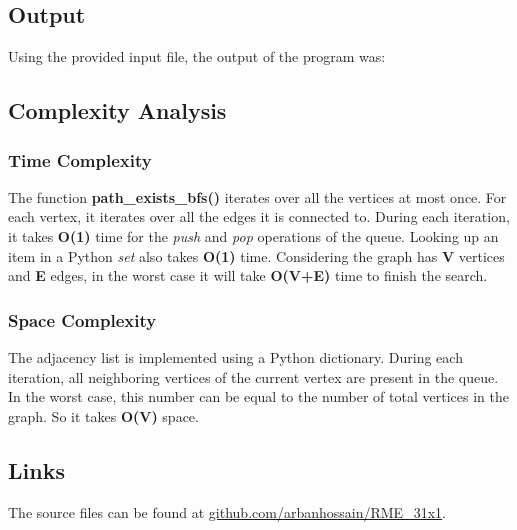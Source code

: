 \documentclass[12pt]{article}
\begin{document}
\subsection*{Output}
Using the provided input file, the output of the program was:
\

\subsection*{Complexity Analysis}
\subsubsection*{Time Complexity}
The function \textbf{path\_exists\_bfs()} iterates over all the vertices at most once. For each vertex, it iterates over all the edges it is connected to. During each iteration, it takes \textbf{O(1)} time for the \textit{push} and \textit{pop} operations of the queue. Looking up an item in a Python \textit{set} also takes \textbf{O(1)} time. Considering the graph has \textbf{V} vertices and \textbf{E} edges, in the worst case it will take \textbf{O(V+E)} time to finish the search.

\subsubsection*{Space Complexity}
The adjacency list is implemented using a Python dictionary. During each iteration, all neighboring vertices of the current vertex are present in the queue. In the worst case, this number can be equal to the number of total vertices in the graph. So it takes \textbf{O(V)} space.

\subsection*{Links}
The source files can be found at \href{https://github.com/arbanhossain/RME_31x1/tree/main/Labs}{github.com/arbanhossain/RME\_31x1}.
\end{document}

